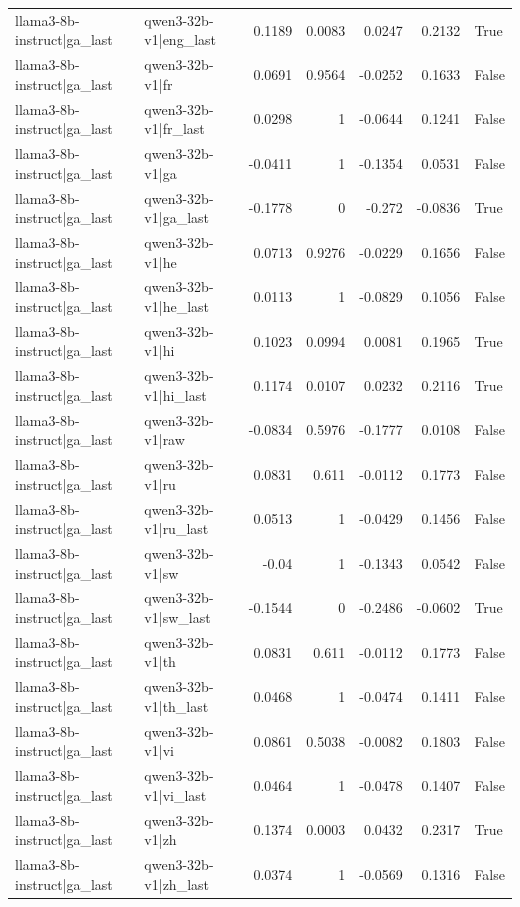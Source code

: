 \begin{table}
\begin{tabular}{l l r r r r l}
llama3-8b-instruct|ga_last & qwen3-32b-v1|eng_last & 0.1189 & 0.0083 & 0.0247 & 0.2132 & True \\
llama3-8b-instruct|ga_last & qwen3-32b-v1|fr & 0.0691 & 0.9564 & -0.0252 & 0.1633 & False \\
llama3-8b-instruct|ga_last & qwen3-32b-v1|fr_last & 0.0298 & 1 & -0.0644 & 0.1241 & False \\
llama3-8b-instruct|ga_last & qwen3-32b-v1|ga & -0.0411 & 1 & -0.1354 & 0.0531 & False \\
llama3-8b-instruct|ga_last & qwen3-32b-v1|ga_last & -0.1778 & 0 & -0.272 & -0.0836 & True \\
llama3-8b-instruct|ga_last & qwen3-32b-v1|he & 0.0713 & 0.9276 & -0.0229 & 0.1656 & False \\
llama3-8b-instruct|ga_last & qwen3-32b-v1|he_last & 0.0113 & 1 & -0.0829 & 0.1056 & False \\
llama3-8b-instruct|ga_last & qwen3-32b-v1|hi & 0.1023 & 0.0994 & 0.0081 & 0.1965 & True \\
llama3-8b-instruct|ga_last & qwen3-32b-v1|hi_last & 0.1174 & 0.0107 & 0.0232 & 0.2116 & True \\
llama3-8b-instruct|ga_last & qwen3-32b-v1|raw & -0.0834 & 0.5976 & -0.1777 & 0.0108 & False \\
llama3-8b-instruct|ga_last & qwen3-32b-v1|ru & 0.0831 & 0.611 & -0.0112 & 0.1773 & False \\
llama3-8b-instruct|ga_last & qwen3-32b-v1|ru_last & 0.0513 & 1 & -0.0429 & 0.1456 & False \\
llama3-8b-instruct|ga_last & qwen3-32b-v1|sw & -0.04 & 1 & -0.1343 & 0.0542 & False \\
llama3-8b-instruct|ga_last & qwen3-32b-v1|sw_last & -0.1544 & 0 & -0.2486 & -0.0602 & True \\
llama3-8b-instruct|ga_last & qwen3-32b-v1|th & 0.0831 & 0.611 & -0.0112 & 0.1773 & False \\
llama3-8b-instruct|ga_last & qwen3-32b-v1|th_last & 0.0468 & 1 & -0.0474 & 0.1411 & False \\
llama3-8b-instruct|ga_last & qwen3-32b-v1|vi & 0.0861 & 0.5038 & -0.0082 & 0.1803 & False \\
llama3-8b-instruct|ga_last & qwen3-32b-v1|vi_last & 0.0464 & 1 & -0.0478 & 0.1407 & False \\
llama3-8b-instruct|ga_last & qwen3-32b-v1|zh & 0.1374 & 0.0003 & 0.0432 & 0.2317 & True \\
llama3-8b-instruct|ga_last & qwen3-32b-v1|zh_last & 0.0374 & 1 & -0.0569 & 0.1316 & False \\

\end{tabular}
\end{table}
